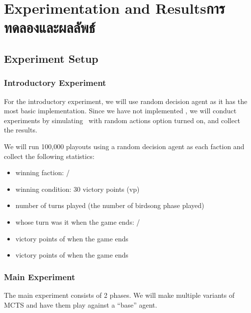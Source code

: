 \chapter{
    \ifenglish Experimentation and Results\else การทดลองและผลลัพธ์\fi
}



\section{Experiment Setup}

\subsection{Introductory Experiment}
For the introductory experiment, we will use random decision agent as it has the most basic implementation. Since we have not implemented \RootAI, we will conduct experiments by simulating \RootOurs \ with random actions option turned on, and collect the results. 

We will run 100,000 \glspl{playout} using a random decision agent as each faction and collect the following statistics:
\begin{itemize}
    \item winning faction: \Marquise{} / \Eyrie
    \item winning condition: 30 victory points (vp)
    \item number of turns played (the number of birdsong phase played)
    \item whose turn was it when the game ends: \Marquise{} / \Eyrie
    \item victory points of \Marquise{} when the game ends
    \item victory points of \Eyrie{} when the game ends
\end{itemize}

\subsection{Main Experiment}
The main experiment consists of 2 phases. We will make multiple variants of MCTS and have them play against a ``base'' agent. 

